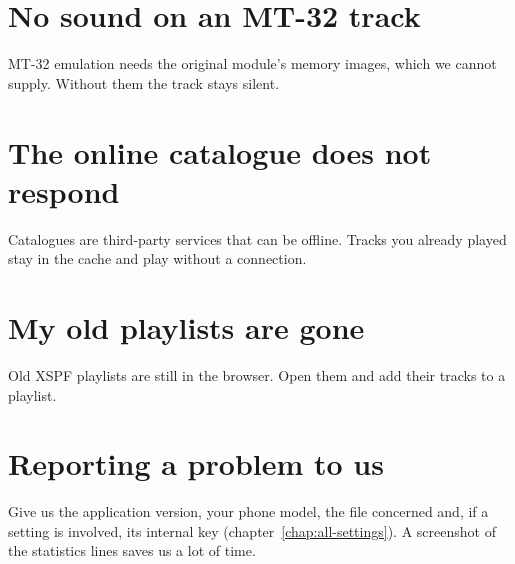 \section{No sound on an MT-32 track}
MT-32 emulation needs the original module's memory images, which we cannot supply. Without them the track stays
silent.

\section{The online catalogue does not respond}
Catalogues are third-party services that can be offline. Tracks you already played stay in the cache and play without
a connection.

\section{My old playlists are gone}
Old XSPF playlists are still in the browser. Open them and add their tracks to a playlist.

\section{Reporting a problem to us}
Give us the application version, your phone model, the file concerned and, if a setting is involved, its internal key
(chapter~\ref{chap:all-settings}). A screenshot of the statistics lines saves us a lot of time.

